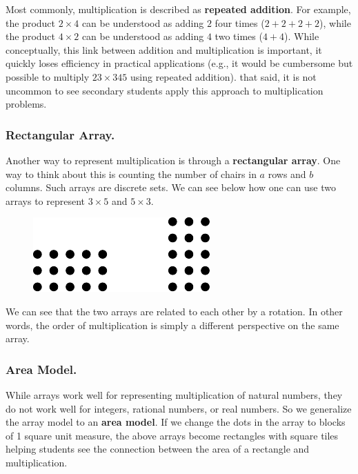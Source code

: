 \documentclass[
]{book}
\theoremstyle{definition}
\theoremstyle{definition}
\theoremstyle{definition}
\theoremstyle{remark}
\begin{document}
Most commonly, multiplication is described as \textbf{repeated addition}. For example, the product \(2\times 4\) can be understood as adding \(2\) four times (\(2+2+2+2\)), while the product \(4\times 2\) can be understood as adding \(4\) two times (\(4+4\)). While conceptually, this link between addition and multiplication is important, it quickly loses efficiency in practical applications (e.g., it would be cumbersome but possible to multiply \(23\times 345\) using repeated addition). that said, it is not uncommon to see secondary students apply this approach to multiplication problems.

\hypertarget{rectangular-array.}{%
\subsubsection*{Rectangular Array.}\label{rectangular-array.}}

Another way to represent multiplication is through a \textbf{rectangular array}. One way to think about this is counting the number of chairs in \(a\) rows and \(b\) columns. Such arrays are discrete sets. We can see below how one can use two arrays to represent \(3\times 5\) and \(5 \times 3\).

\begin{figure}

{\centering \includegraphics[width=0.5\linewidth]{tikz/arrays} 

}

\end{figure}

We can see that the two arrays are related to each other by a rotation. In other words, the order of multiplication is simply a different perspective on the same array.

\hypertarget{area-model.}{%
\subsubsection*{Area Model.}\label{area-model.}}

While arrays work well for representing multiplication of natural numbers, they do not work well for integers, rational numbers, or real numbers. So we generalize the array model to an \textbf{area model}. If we change the dots in the array to blocks of 1 square unit measure, the above arrays become rectangles with square tiles helping students see the connection between the area of a rectangle and multiplication.
\end{document}
